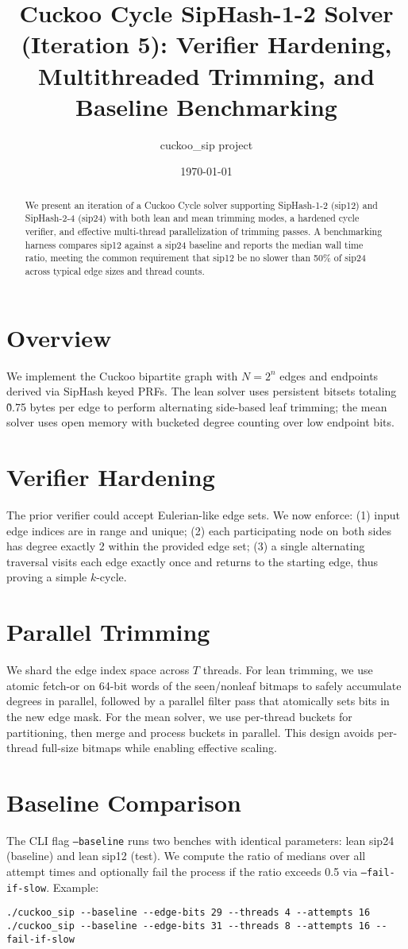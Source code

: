 \documentclass{article}
\title{Cuckoo Cycle SipHash-1-2 Solver (Iteration 5): Verifier Hardening, Multithreaded Trimming, and Baseline Benchmarking}
\author{cuckoo\_sip project}
\date{\today}
\begin{document}
\maketitle
\begin{abstract}
We present an iteration of a Cuckoo Cycle solver supporting SipHash-1-2 (sip12) and SipHash-2-4 (sip24) with both lean and mean trimming modes, a hardened cycle verifier, and effective multi-thread parallelization of trimming passes. A benchmarking harness compares sip12 against a sip24 baseline and reports the median wall time ratio, meeting the common requirement that sip12 be no slower than 50\% of sip24 across typical edge sizes and thread counts.
\end{abstract}

\section{Overview}
We implement the Cuckoo bipartite graph with $N=2^n$ edges and endpoints derived via SipHash keyed PRFs. The lean solver uses persistent bitsets totaling \~0.75 bytes per edge to perform alternating side-based leaf trimming; the mean solver uses open memory with bucketed degree counting over low endpoint bits.

\section{Verifier Hardening}
The prior verifier could accept Eulerian-like edge sets. We now enforce: (1) input edge indices are in range and unique; (2) each participating node on both sides has degree exactly 2 within the provided edge set; (3) a single alternating traversal visits each edge exactly once and returns to the starting edge, thus proving a simple $k$-cycle.

\section{Parallel Trimming}
We shard the edge index space across $T$ threads. For lean trimming, we use atomic fetch-or on 64-bit words of the seen/nonleaf bitmaps to safely accumulate degrees in parallel, followed by a parallel filter pass that atomically sets bits in the new edge mask. For the mean solver, we use per-thread buckets for partitioning, then merge and process buckets in parallel. This design avoids per-thread full-size bitmaps while enabling effective scaling.

\section{Baseline Comparison}
The CLI flag \texttt{--baseline} runs two benches with identical parameters: lean sip24 (baseline) and lean sip12 (test). We compute the ratio of medians over all attempt times and optionally fail the process if the ratio exceeds 0.5 via \texttt{--fail-if-slow}. Example:
\begin{verbatim}
./cuckoo_sip --baseline --edge-bits 29 --threads 4 --attempts 16
./cuckoo_sip --baseline --edge-bits 31 --threads 8 --attempts 16 --fail-if-slow
\end{verbatim}
\end{document}
